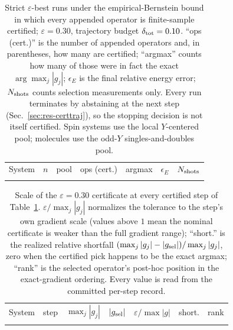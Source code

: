 \documentclass[aps,pra,reprint,superscriptaddress,nofootinbib,floatfix]{revtex4-2}
\begin{document}
\begin{table}[t]
\caption{Strict $\varepsilon$-best runs under the empirical-Bernstein bound in which every appended operator is finite-sample certified; $\varepsilon=0.30$, trajectory budget $\delta_{\rm tot}=0.10$. ``ops (cert.)'' is the number of appended operators and, in parentheses, how many are certified; ``argmax'' counts how many of those were in fact the exact $\arg\max_j|g_j|$; $\epsilon_E$ is the final relative energy error; $N_{\rm shots}$ counts selection measurements only. Every run terminates by abstaining at the next step (Sec.~\ref{sec:res-certtraj}), so the stopping decision is not itself certified. Spin systems use the local $Y$-centered pool; molecules use the odd-$Y$ singles-and-doubles pool.}
\label{tab:certtraj}
\centering
\footnotesize
\begin{ruledtabular}
\begin{tabular}{lrrrrrr}
System & $n$ & pool & ops (cert.) & argmax & $\epsilon_E$ & $N_{\rm shots}$\\
\colrule

\end{tabular}
\end{ruledtabular}
\end{table}

\begin{table}[t]
\caption{Scale of the $\varepsilon=0.30$ certificate at every certified step of Table~\ref{tab:certtraj}. $\varepsilon/\max_j|g_j|$ normalizes the tolerance to the step's own gradient scale (values above $1$ mean the nominal certificate is weaker than the full gradient range); ``short.'' is the realized relative shortfall $(\max_j|g_j|-|g_{\rm sel}|)/\max_j|g_j|$, zero when the certified pick happens to be the exact argmax; ``rank'' is the selected operator's post-hoc position in the exact-gradient ordering. Every value is read from the committed per-step record.}
\label{tab:epsscale}
\centering
\footnotesize
\begin{ruledtabular}
\begin{tabular}{llrrrrr}
System & step & $\max_j|g_j|$ & $|g_{\rm sel}|$ & $\varepsilon/\max|g|$ & short. & rank\\
\colrule

\end{tabular}
\end{ruledtabular}
\end{table}
\end{document}
